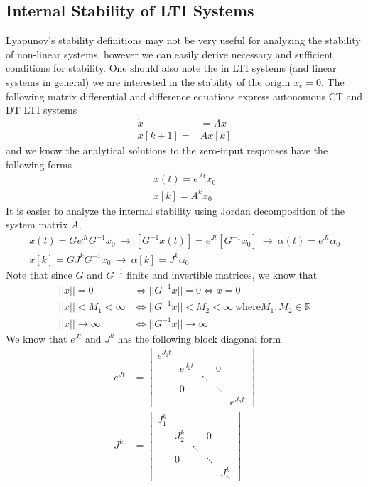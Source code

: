 \documentclass[twoside]{article}
\begin{document}
\subsection{Internal Stability of LTI Systems}

Lyapunov's stability definitions may not be very useful for analyzing
the stability of non-linear systems, however we can easily derive
necessary and sufficient conditions for stability. One should also note the 
in LTI systems (and linear systems in general) we are interested in the
stability of the origin $x_e = 0$. The following matrix differential and difference equations express autonomous CT and DT LTI systems
%
\begin{align*}
\dot{x} &= A x 
\\
x[k+1] =& A x[k]
\end{align*}
%
and we know the analytical solutions to the zero-input responses have the following forms
%
\begin{align*}
x(t) = e^{A t} x_0
\\
x[k] = A^k x_0
\end{align*}
%
It is easier to analyze the internal stability using Jordan decomposition of the system matrix $A$, 
%
\begin{align*}
x(t) = G e^{J t} G^{-1} x_0 \ \rightarrow \  \left[ G^{-1} x(t) \right] = e^{J t} \left[ G^{-1} x_0 \right] \ \rightarrow \ \alpha(t) = e^{J t} \alpha_0
\\
x[k] = G J^k G^{-1} x_0  \ \rightarrow \ \alpha[k] = J^k \alpha_0
\end{align*}
%
Note that since $G$ and $G^{-1}$ finite and invertible matrices, we know that 
%
\begin{align*}
|| x || = 0 &\iff || G^{-1} x || = 0 \iff x = 0 
\\
|| x || < M_1 < \infty &\iff || G^{-1} x || < M_2 < \infty \ \mathrm{where} M_1 , M_2 \in \mathbb{R}
\\
|| x || \to \infty &\iff || G^{-1} x || \to \infty 
\end{align*}
%
We know that $e^{J t}$ and $J^k$ has the following block diagonal form
%
\begin{align*}
e^{J t} &= \left[ \begin{array}{ccccc} e^{J_1 t} &  & & &  \\  & e^{J_2 t}  &  & 0 &  \\ &  & \ddots & \\ & 0 & & \ddots & \\ & &  & &  e^{J_n t}  \end{array} \right]
\\
J^k &= \left[ \begin{array}{ccccc} J_1^k &  & & &  \\  & J_2^k  &  & 0 &  \\ &  & \ddots & \\ & 0 & & \ddots & \\ & &  & &  J_n^k  \end{array} \right]
\end{align*}
\end{document}
